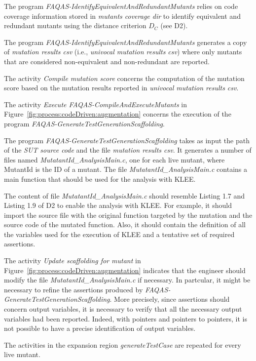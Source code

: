 \RQ{} The program \emph{FAQAS-IdentifyEquivalentAndRedundantMutants} relies on code coverage information stored in \emph{mutants coverage dir} to identify equivalent and redundant mutants using the distance criterion $D_C$ (see D2).

\RQ{} The program \emph{FAQAS-IdentifyEquivalentAndRedundantMutants} generates a copy of \emph{mutation results csv} (i.e., \emph{univocal mutation results csv}) where only mutants that are considered non-equivalent and non-redundant are reported.

\RQ{} The activity \emph{Compile mutation score} concerns the computation of the mutation score based on the mutation results reported in \emph{univocal mutation results csv}.

\RQ{} The activity \emph{Execute FAQAS-CompileAndExecuteMutants} in Figure~\ref{fig:process:codeDriven:augmentation} concerns the execution of the program \emph{FAQAS-GenerateTestGenerationScaffolding}.

\RQ{} The program \emph{FAQAS-GenerateTestGenerationScaffolding} takes as input the path of the \emph{SUT source code} and the file \emph{mutation results csv}. It generates a number of files named \emph{MutatantId\_AnalysisMain.c}, one for each live mutant, where MutantId is the ID of a mutant. The file \emph{MutatantId\_AnalysisMain.c} contains a main function that should be used for the analysis with KLEE. 

\RQ{} The content of file \emph{MutatantId\_AnalysisMain.c} should resemble Listing 1.7 and Listing 1.9 of D2 to enable the analysis with KLEE. For example, it should import the source file with the original function targeted by the mutation and the source code of the mutated function. Also, it should contain the definition of all the variables used for the execution of KLEE and a tentative set of required assertions.

\RQ{} The activity \emph{Update scaffolding for mutant} in Figure~\ref{fig:process:codeDriven:augmentation} indicates that the engineer should modify the file  \emph{MutatantId\_AnalysisMain.c} if necessary. In partcular, it might be necessary to refine the assertions produced by \emph{FAQAS-GenerateTestGenerationScaffolding}. More precisely, since assertions should concern output variables, it is necessary to verify that all the necessary output variables had been reported. Indeed, with pointers and pointers to pointers, it is not possible to have a precise identification of output variables.

\RQ{} The activities in the expansion region \emph{generateTestCase} are repeated for every live mutant.

